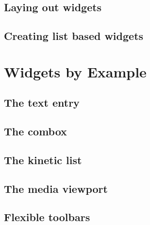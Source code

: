 \documentclass[12pt,a4paper,english]{book}
\begin{document}

\hypertarget{laying-out-widgets}{}
\section{Laying out widgets}
\label{laying-out-widgets}



\hypertarget{creating-list-based-widgets}{}
\section{Creating list based widgets}
\label{creating-list-based-widgets}



\hypertarget{widgets-by-example}{}
\chapter{Widgets by Example}
\label{widgets-by-example}



\hypertarget{the-text-entry}{}
\section{The text entry}
\label{the-text-entry}



\hypertarget{the-combox}{}
\section{The combox}
\label{the-combox}



\hypertarget{the-kinetic-list}{}
\section{The kinetic list}
\label{the-kinetic-list}



\hypertarget{the-media-viewport}{}
\section{The media viewport}
\label{the-media-viewport}



\hypertarget{flexible-toolbars}{}
\section{Flexible toolbars}
\label{flexible-toolbars}
\end{document}
